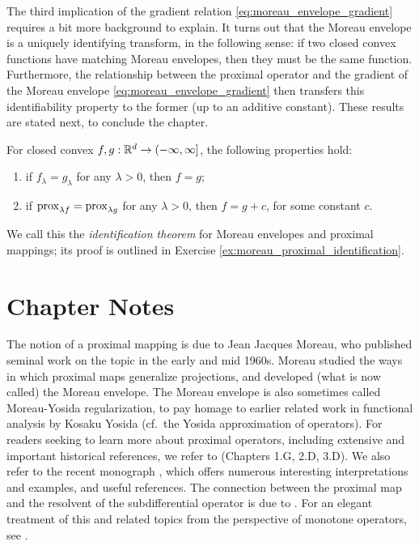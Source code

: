 The third implication of the gradient relation
\eqref{eq:moreau_envelope_gradient} requires a bit more background to
explain. It turns out that the Moreau envelope is a uniquely identifying
transform, in the following sense: if two closed convex functions have matching
Moreau envelopes, then they must be the same function. Furthermore, the
relationship between the proximal operator and the gradient of the Moreau
envelope \eqref{eq:moreau_envelope_gradient} then transfers this identifiability
property to the former (up to an additive constant). These results are stated
next, to conclude the chapter.      

\begin{Theorem}
\label{thm:moreau_proximal_identification}
For closed convex $f,g : \mathbb{R}^d \to (-\infty, \infty]$, the following properties
hold: 
\begin{enumerate}[label=(\roman*)]
\item if $f_\lambda = g_\lambda$ for any $\lambda > 0$, then $f = g$; 
\item if $\operatorname{prox}_{\lambda f} = \operatorname{prox}_{\lambda g}$ for any $\lambda > 0$, then $f
  = g + c$, for some constant $c$. 
\end{enumerate} 
\end{Theorem}


We call this the \emph{identification theorem} for Moreau envelopes and proximal
mappings; its proof is outlined in Exercise
\ref{ex:moreau_proximal_identification}.  

\SkipTocEntry\section*{Chapter Notes}

The notion of a proximal mapping is due to Jean Jacques Moreau, who published
seminal work on the topic in the early and mid 1960s. Moreau studied the ways in
which proximal maps generalize projections, and developed (what is now called)
the Moreau envelope. The Moreau envelope is also sometimes called Moreau-Yosida
regularization, to pay homage to earlier related work in functional analysis by
Kosaku Yosida (cf.\ the Yosida approximation of operators). For readers seeking
to learn more about proximal operators, including extensive and important
historical references, we refer to \cite{rockafellar2009variational} (Chapters
1.G, 2.D, 3.D). We also refer to the recent monograph \cite{parikh2013proximal},
which offers numerous interesting interpretations and examples, and useful 
references. The connection between the proximal map and the resolvent of the
subdifferential operator is due to \cite{rockafellar1976monotone}. For an
elegant treatment of this and related topics from the perspective of monotone
operators, see \cite{bauschke2011convex}.

